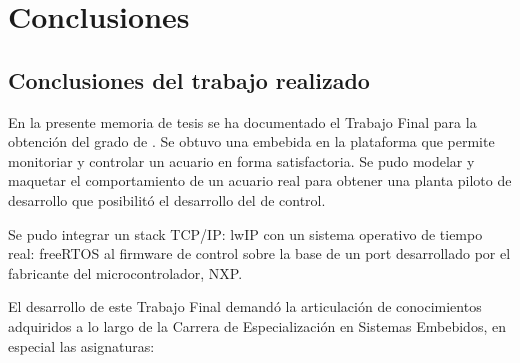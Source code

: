 
\chapter{Conclusiones} %

\label{Chapter5} %






\section{Conclusiones del trabajo realizado}

En la presente memoria de tesis se ha documentado el Trabajo Final para la obtención del grado de \degreename.  Se obtuvo una  embebida en la plataforma  que permite monitoriar y controlar un acuario en forma satisfactoria. Se pudo modelar y maquetar el comportamiento de un acuario real para obtener una planta piloto de desarrollo que posibilitó el desarrollo del  de control.

Se pudo integrar un stack TCP/IP: lwIP con un sistema operativo de tiempo real: freeRTOS al firmware de control sobre la base de un port desarrollado por el fabricante del microcontrolador, NXP.

\medskip

El desarrollo de este Trabajo Final demandó la articulación de conocimientos  adquiridos a lo largo de la Carrera de Especialización en Sistemas Embebidos, en especial las asignaturas:

